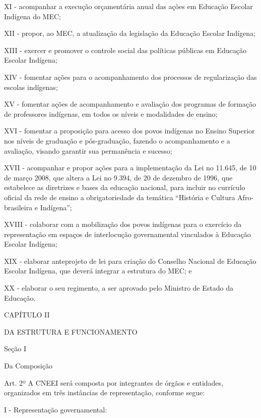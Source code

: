 \documentclass[
]{book}
\begin{document}
XI - acompanhar a execução orçamentária anual das ações em Educação Escolar Indígena do MEC;

XII - propor, ao MEC, a atualização da legislação da Educação Escolar Indígena;

XIII - exercer e promover o controle social das políticas públicas em Educação Escolar Indígena;

XIV - fomentar ações para o acompanhamento dos processos de regularização das escolas indígenas;

XV - fomentar ações de acompanhamento e avaliação dos programas de formação de professores indígenas, em todos os níveis e modalidades de ensino;

XVI - fomentar a proposição para acesso dos povos indígenas no Ensino Superior nos níveis de graduação e pós-graduação, fazendo o acompanhamento e a avaliação, visando garantir sua permanência e sucesso;

XVII - acompanhar e propor ações para a implementação da Lei no 11.645, de 10 de março 2008, que altera a Lei no 9.394, de 20 de dezembro de 1996, que estabelece as diretrizes e bases da educação nacional, para incluir no currículo oficial da rede de ensino a obrigatoriedade da temática ``História e Cultura Afro-brasileira e Indígena'';

XVIII - colaborar com a mobilização dos povos indígenas para o exercício da representação em espaços de interlocução governamental vinculados à Educação Escolar Indígena;

XIX - elaborar anteprojeto de lei para criação do Conselho Nacional de Educação Escolar Indígena, que deverá integrar a estrutura do MEC; e

XX - elaborar o seu regimento, a ser aprovado pelo Ministro de Estado da Educação.

CAPÍTULO II

DA ESTRUTURA E FUNCIONAMENTO

Seção I

Da Composição

Art. 2º A CNEEI será composta por integrantes de órgãos e entidades, organizados em três instâncias de representação, conforme segue:

I - Representação governamental:
\end{document}
